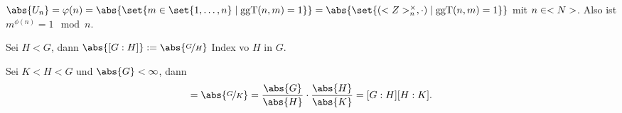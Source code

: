 \begin{conclusion}
	$\abs{U_n} = \phi(n) = \abs{\set{m \in \set{1, \dots,n} \mid \ggT(n,m) = 1}} = \abs{\set{(\Z_n^{\times}, \cdot) \mid \ggT(n,m) = 1}}$ mit $n \in <N>$. Also ist $m^{\phi(n)} = 1 \mod n$.
\end{conclusion}
\begin{definition}[Index]
	Sei $H < G$, dann $\abs{[G:H]} := \abs{\lnkset{G}{H}}$ Index vo $H$ in $G$.
\end{definition}
\begin{conclusion}
	Sei $K < H < G$ und $\abs{G} < \infty$, dann
	\begin{align*}
		[G:K] = \abs{\lnkset{G}{K}} = \frac{\abs{G}}{\abs{H}}\cdot \frac{\abs{H}}{\abs{K}} = [G:H][H:K].
	\end{align*}
\end{conclusion}
